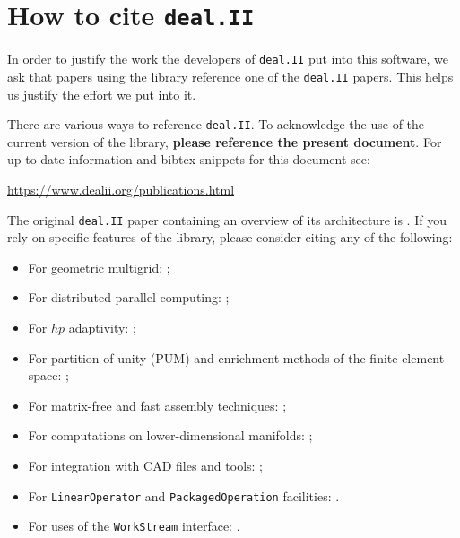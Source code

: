 \documentclass{ansarticle-preprint}
\newcommand{\specialword}[1]{\texttt{#1}}
\newcommand{\dealii}{{\specialword{deal.II}}\xspace}
\begin{document}
\section{How to cite \dealii}\label{sec:cite}

In order to justify the work the developers of \dealii put into this
software, we ask that papers using the library reference one of the
\dealii papers. This helps us justify the effort we put into it.

There are various ways to reference \dealii. To acknowledge the use of
the current version of the library, \textbf{please reference the present
document}. For up to date information and bibtex snippets for this document
see:
\begin{center}
 \url{https://www.dealii.org/publications.html}
\end{center}

The original \texttt{\dealii} paper containing an overview of its
architecture is \cite{BangerthHartmannKanschat2007}. If you rely on
specific features of the library, please consider citing any of the
following:
\begin{itemize}
 \item For geometric multigrid: \cite{Kanschat2004,JanssenKanschat2011};
 \item For distributed parallel computing: \cite{BangerthBursteddeHeisterKronbichler11};
 \item For $hp$ adaptivity: \cite{BangerthKayserHerold2007};
  \item For partition-of-unity (PUM) and enrichment methods of the
    finite element space: \cite{Davydov2016};
 \item For matrix-free and fast assembly techniques:
   \cite{KronbichlerKormann2012};
 \item For computations on lower-dimensional manifolds:
   \cite{DeSimoneHeltaiManigrasso2009};
 \item For integration with CAD files and tools:
   \cite{HeltaiMola2015};
 \item For \texttt{LinearOperator} and \texttt{PackagedOperation} facilities:
   \cite{MaierBardelloniHeltai-2016-a,MaierBardelloniHeltai-2016-b}.
 \item For uses of the \texttt{WorkStream} interface:
   \cite{TKB16}.
\end{itemize}
\end{document}
